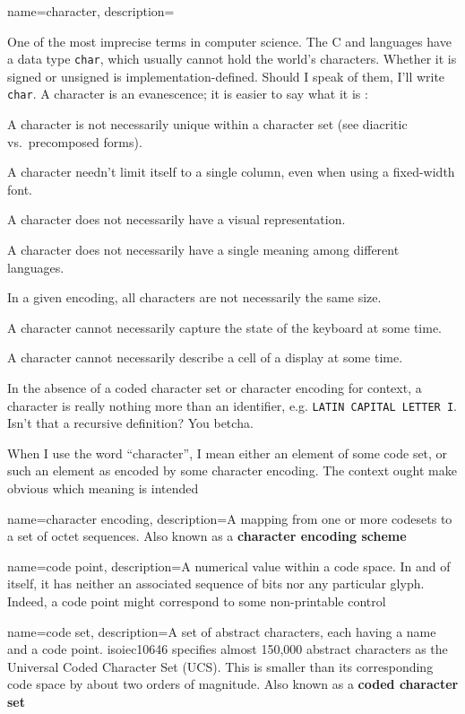 {
  name={character},
description={One of the most imprecise terms in computer science. The C and \CC
  languages have a data type \texttt{char}, which usually cannot hold the
  world's characters. Whether it is signed or unsigned is implementation-defined.
  Should I speak of them, I'll write \texttt{char}. A character is an evanescence;
  it is easier to say what it is :
  \begin{denseitemize}
  \item{A character is not necessarily unique within a character set (see diacritic vs.\ precomposed forms).}
  \item{A character needn't limit itself to a single column, even when using a fixed-width font.}
  \item{A character does not necessarily have a visual representation.}
  \item{A character does not necessarily have a single meaning among different languages.}
  \item{In a given encoding, all characters are not necessarily the same size.}
  \item{A character cannot necessarily capture the state of the keyboard at some time.}
  \item{A character cannot necessarily describe a cell of a display at some time.}
  \end{denseitemize}

  In the absence of a coded character set or character encoding for context, a
  character is really nothing more than an identifier, e.g. \texttt{LATIN
    CAPITAL LETTER I}. Isn't that a recursive definition? You betcha.

  When I use the word ``character'', I mean either an element of some code set, or
  such an element as encoded by some character encoding. The context ought make
  obvious which meaning is intended}
}

{
  name={character encoding},
  description={A mapping from one or more \glspl{codeset} to a set of octet
  sequences. Also known as a \textbf{character encoding scheme}\cite{rfc2978}}
}

{
  name={code point},
description={A numerical value within a code space. In and of itself,
  it has neither an associated sequence of bits nor any particular glyph.
  Indeed, a code point might correspond to some non-printable control}
}

{
  name={code set},
description={A set of abstract characters, each having a name and a code
  point. \Gls{isoiec10646} specifies almost 150,000 abstract characters as the
  Universal Coded Character Set (UCS). This is smaller than its corresponding
  code space by about two orders of magnitude. Also known as a
  \textbf{coded character set}\cite{rfc2978}}
}

